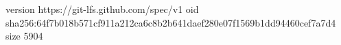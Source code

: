 version https://git-lfs.github.com/spec/v1
oid sha256:64f7b018b571cf911a212ca6c8b2b641daef280e07f1569b1dd94460cef7a7d4
size 5904
